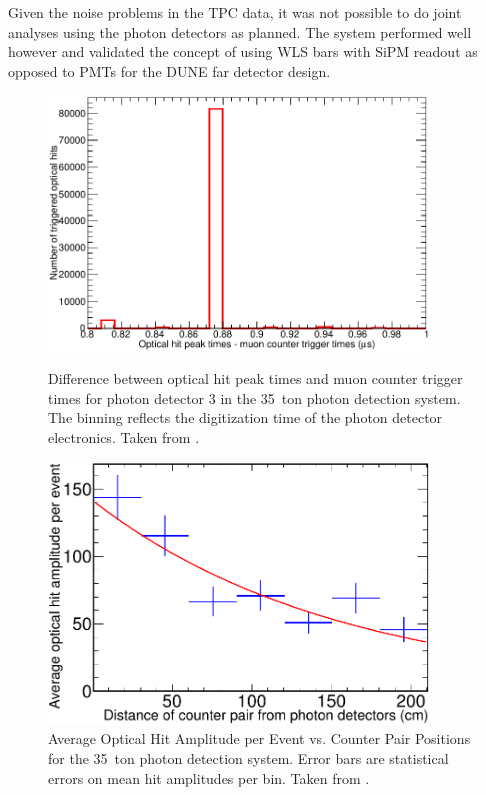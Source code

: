 Given the noise problems in the TPC data, it was not possible to do joint analyses using the photon detectors as planned.  The system performed well however and validated the concept of using WLS bars with SiPM readout as opposed to PMTs for the DUNE far detector design.

\begin{figure}

  \begin{minipage}[t]{0.48\linewidth}
    \centering
    \includegraphics[width=0.9\textwidth]{35tonPhotonDetectorsResolution.pdf}
    \caption[Difference between optical hit peak times and muon counter trigger times for photon detector 3 in the 35~ton photon detection system.]{Difference between optical hit peak times and muon counter trigger times for photon detector 3 in the 35~ton photon detection system. The binning reflects the digitization time of the photon detector electronics.  Taken from \cite{35tonPhotonDetectors}.}
    \label{fig:35tonPhotonDetectorsResolution}
  \end{minipage}
  \hfill
  \begin{minipage}[t]{0.48\linewidth}
    \centering
    \includegraphics[width=0.9\textwidth]{35tonPhotonDetectorsAttenuation.pdf}
    \caption[Average Optical Hit Amplitude per Event vs. Counter Pair Positions for the 35~ton photon detection system.]{Average Optical Hit Amplitude per Event vs. Counter Pair Positions for the 35~ton photon detection system.  Error bars are statistical errors on mean hit amplitudes per bin.  Taken from \cite{35tonPhotonDetectors}.}
    \label{fig:35tonPhotonDetectorsAttenuation}
  \end{minipage}

\end{figure}

